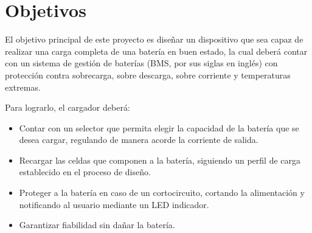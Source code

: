 \section{Objetivos}

El objetivo principal de este proyecto es diseñar un dispositivo que sea capaz de realizar
una carga completa de una batería en buen estado,
la cual deberá contar con un sistema de gestión de baterías (BMS, por sus siglas en inglés)
con protección contra sobrecarga, sobre descarga, sobre corriente y temperaturas extremas.

Para lograrlo, el cargador deberá:
\begin{itemize}
    \item Contar con un selector que permita elegir la capacidad de la batería que se desea cargar, regulando de manera acorde la corriente de salida.
    \item Recargar las celdas que componen a la batería, siguiendo un perfil de carga establecido en el proceso de diseño.
    \item Proteger a la batería en caso de un cortocircuito, cortando la alimentación y notificando al usuario mediante un LED indicador.
    \item Garantizar fiabilidad sin dañar la batería.
\end{itemize}